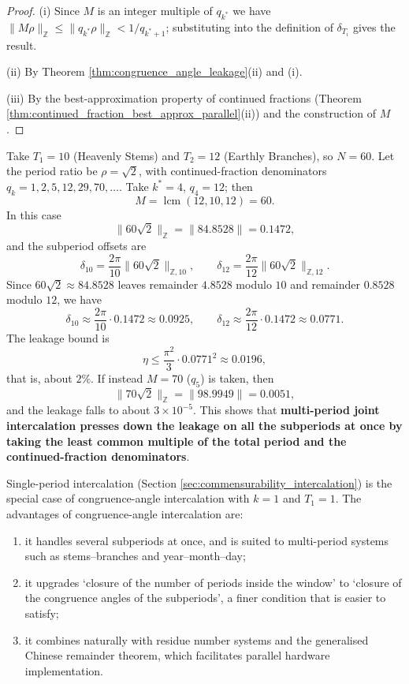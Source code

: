 \begin{proof}
(i) Since $M$ is an integer multiple of $q_{k^\ast}$ we have $\|M\rho\|_{\mathbb{Z}}\le\|q_{k^\ast}\rho\|_{\mathbb{Z}}<1/q_{k^\ast+1}$; substituting into the definition of $\delta_{T_i}$ gives the result.

(ii) By Theorem \ref{thm:congruence_angle_leakage}(ii) and (i).

(iii) By the best-approximation property of continued fractions (Theorem \ref{thm:continued_fraction_best_approx_parallel}(ii)) and the construction of $M$.
\end{proof}

\begin{example}\label{ex:sexagenary_intercalation}
Take $T_1=10$ (Heavenly Stems) and $T_2=12$ (Earthly Branches), so $N=60$. Let the period ratio be $\rho=\sqrt2$, with continued-fraction denominators $q_k=1,2,5,12,29,70,\dots$. Take $k^\ast=4$, $q_4=12$; then
\[
M=\operatorname{lcm}(12,10,12)=60.
\]
In this case
\[
\|60\sqrt2\|_{\mathbb{Z}}=\|84.8528\|=0.1472,
\]
and the subperiod offsets are
\[
\delta_{10}=\frac{2\pi}{10}\|60\sqrt2\|_{\mathbb{Z},10},\qquad
\delta_{12}=\frac{2\pi}{12}\|60\sqrt2\|_{\mathbb{Z},12}.
\]
Since $60\sqrt2\approx84.8528$ leaves remainder $4.8528$ modulo $10$ and remainder $0.8528$ modulo $12$, we have
\[
\delta_{10}\approx\frac{2\pi}{10}\cdot0.1472\approx0.0925,\qquad
\delta_{12}\approx\frac{2\pi}{12}\cdot0.1472\approx0.0771.
\]
The leakage bound is
\[
\eta\le\frac{\pi^2}{3}\cdot0.0771^2\approx0.0196,
\]
that is, about $2\%$. If instead $M=70$ ($q_5$) is taken, then
\[
\|70\sqrt2\|_{\mathbb{Z}}=\|98.9949\|=0.0051,
\]
and the leakage falls to about $3\times10^{-5}$. This shows that \textbf{multi-period joint intercalation presses down the leakage on all the subperiods at once by taking the least common multiple of the total period and the continued-fraction denominators}.
\end{example}

\begin{remark}\label{rem:congruence_vs_single_intercalation}
Single-period intercalation (Section \ref{sec:commensurability_intercalation}) is the special case of congruence-angle intercalation with $k=1$ and $T_1=1$. The advantages of congruence-angle intercalation are:
\begin{enumerate}[label=(\roman*)]
    \item it handles several subperiods at once, and is suited to multi-period systems such as stems--branches and year--month--day;
    \item it upgrades `closure of the number of periods inside the window' to `closure of the congruence angles of the subperiods', a finer condition that is easier to satisfy;
    \item it combines naturally with residue number systems and the generalised Chinese remainder theorem, which facilitates parallel hardware implementation.
\end{enumerate}
\end{remark}

